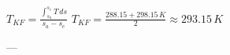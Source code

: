 \( T_{KF} = \frac{\int_{s_a}^{s_e} T \, ds}{s_a - s_e} \)  
\( T_{KF} = \frac{288.15 + 298.15 \, K}{2} \approx 293.15 \, K \)  

---